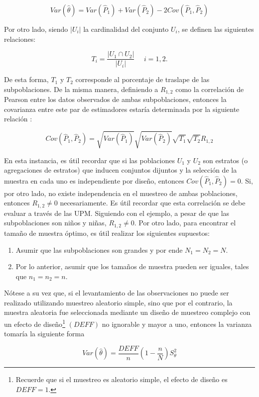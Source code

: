 \documentclass[
  12pt,
  spanish,
]{book}
\providecommand{\tightlist}{%
  \setlength{\itemsep}{0pt}\setlength{\parskip}{0pt}}
\begin{document}
\[
Var(\hat{\theta})=Var\left(\hat{P}_1\right)+Var\left(\hat{P}_2\right)-2Cov\left(\hat{P}_1, \hat{P}_2\right)
\]

Por otro lado, siendo \(|U_i|\) la cardinalidad del conjunto \(U_i\), se definen las siguientes relaciones:

\[
T_i = \frac{|U_1 \cap U_2|}{|U_i|} \ \ \ \ \ \ i =1, 2. 
\]

De esta forma, \(T_1\) y \(T_2\) corresponde al porcentaje de traslape de las subpoblaciones. De la misma manera, definiendo a \(R_{1,2}\) como la correlación de Pearson entre los datos observados de ambas subpoblaciones, entonces la covarianza entre este par de estimadores estaría determinada por la siguiente relación \citep{Kish_2004}:

\[
Cov(\hat{P}_1, \hat{P}_2) = \sqrt{Var(\hat{P}_1)}\sqrt{Var(\hat{P}_2)}\sqrt{T_1}\sqrt{T_2}R_{1,2}
\]

En esta instancia, es útil recordar que si las poblaciones \(U_1\) y \(U_2\) son estratos (o agregaciones de estratos) que inducen conjuntos dijuntos y la selección de la muestra en cada uno es independiente por diseño, entonces \(Cov(\hat{P}_1, \hat{P}_2) = 0\). Si, por otro lado, no existe independencia en el muestreo de ambas poblaciones, entonces \(R_{1,2} \neq 0\) necesariamente. Es útil recordar que esta correlación se debe evaluar a través de las UPM. Siguiendo con el ejemplo, a pesar de que las subpoblaciones son niños y niñas, \(R_{1,2} \neq 0\). Por otro lado, para encontrar el tamaño de muestra óptimo, es útil realizar los siguientes supuestos:

\begin{enumerate}
\def\labelenumi{\arabic{enumi}.}
\tightlist
\item
  Asumir que las subpoblaciones son grandes y por ende \(N_1=N_2=N\).
\item
  Por lo anterior, asumir que los tamaños de muestra pueden ser iguales, tales que \(n_1=n_2=n\).
\end{enumerate}

Nótese a su vez que, si el levantamiento de las observaciones no puede ser realizado utilizando muestreo aleatorio simple, sino que por el contrario, la muestra aleatoria fue seleccionada mediante un diseño de muestreo complejo con un efecto de diseño\footnote{Recuerde que si el muestreo es aleatorio simple, el efecto de diseño es \(DEFF=1\).} \((DEFF)\) no ignorable y mayor a uno, entonces la varianza tomaría la siguiente forma

\[
Var(\hat{\theta})=\frac{DEFF}{n}\left(1-\frac{n}{N}\right)S^2_{\theta}
\]
\end{document}
